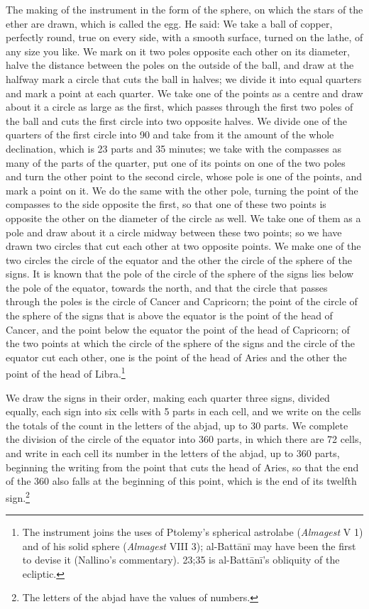\documentclass[11pt]{article}
\newcommand{\ArPage}[1]{\marginpar{\footnotesize\color{gray}Ar.\,p.\,#1}}
\begin{document}
\par The making of the instrument in the form of the sphere, on which the stars of the ether are drawn, which is called the egg. He said: We take a ball of copper, perfectly round, true on every side, with a smooth surface, turned on the lathe, of any size you like. We mark on it two poles opposite each other on its diameter, halve the distance between the poles on the outside of the ball, and draw at the halfway mark a circle that cuts the ball in halves; we divide it into equal quarters and mark a point at each quarter. We take one of the points as a centre and draw about it a circle as large as the first, which passes through the first two poles of the ball and cuts the first circle into two opposite halves. We divide one of the quarters of the first circle into 90 and take from it the amount of the whole declination, which is 23 parts and 35 minutes; we take with the compasses as many of the parts of the quarter, put one of its points on one of the two poles and turn the other point to the second circle, whose pole is one of the points, and mark a point on it. We do the same with the other pole, turning the point of the compasses to the side opposite the first, so that one of these two points is opposite the other on the diameter of the circle as well. We take one of them as a pole and draw about it a circle midway between these two points; so we have drawn two circles that cut each other at two opposite points. We make one of the two circles the circle of the equator and the other the circle of the sphere of the signs. It is known that the pole of the circle of the sphere of the signs lies below the pole of the equator, towards the north, and that the circle that passes through the poles is the circle of Cancer and Capricorn; the point of the circle of the sphere of the signs that is above the equator is the point of the head of Cancer, and the point below the equator the point of the head of Capricorn; of the two points at which the circle of the sphere of the signs and the circle of the equator cut each other, one is the point of the head of Aries and the other the point of the head of Libra.\footnote{The instrument joins the uses of Ptolemy's spherical astrolabe (\emph{Almagest} V 1) and of his solid sphere (\emph{Almagest} VIII 3); al-Battānī may have been the first to devise it (Nallino's commentary). 23;35 is al-Battānī's obliquity of the ecliptic.}\par
\par \ArPage{211}We draw the signs in their order, making each quarter three signs, divided equally, each sign into six cells with 5 parts in each cell, and we write on the cells the totals of the count in the letters of the abjad, up to 30 parts. We complete the division of the circle of the equator into 360 parts, in which there are 72 cells, and write in each cell its number in the letters of the abjad, up to 360 parts, beginning the writing from the point that cuts the head of Aries, so that the end of the 360 also falls at the beginning of this point, which is the end of its twelfth sign.\footnote{The letters of the abjad have the values of numbers.}\par
\end{document}
